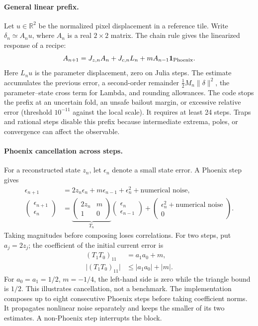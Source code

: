 \documentclass[11pt,a4paper]{article}
\numberwithin{equation}{section}
\newcommand{\abs}[1]{\lvert#1\rvert}
\begin{document}
\paragraph{General linear prefix.}
Let \(u\in\mathbb R^2\) be the normalized pixel displacement in a
reference tile. Write \(\delta_n\simeq A_nu\), where \(A_n\) is a
real \(2\times2\) matrix. The chain rule gives the linearized response
of a recipe:
\begin{equation}
  A_{n+1}=J_{z,n}A_n+J_{c,n}L_n+
           mA_{n-1}\mathbf1_{\rm Phoenix}. \label{eq:prefix-matrix}
\end{equation}
Here \(L_nu\) is the parameter displacement, zero on Julia steps.
The estimate accumulates the previous error, a second-order remainder
\(\tfrac12 M_n\|\delta\|^2\), the parameter--state cross term for
Lambda, and rounding allowances. The code stops the prefix at an
uncertain fold, an unsafe bailout margin, or excessive relative error
(threshold \(10^{-11}\) against the local scale). It requires at least
24 steps. Traps and rational steps disable this prefix because
intermediate extrema, poles, or convergence can affect the observable.

\paragraph{Phoenix cancellation across steps.}
For a reconstructed state \(z_n\), let \(\epsilon_n\) denote a small
state error. A Phoenix step gives
\begin{align}
  \epsilon_{n+1}
    &=2z_n\epsilon_n+m\epsilon_{n-1}
      +\epsilon_n^2+\text{numerical noise},\\
  \begin{pmatrix}\epsilon_{n+1}\\\epsilon_n\end{pmatrix}
    &=
    \underbrace{\begin{pmatrix}2z_n&m\\1&0\end{pmatrix}}_{T_n}
    \begin{pmatrix}\epsilon_n\\\epsilon_{n-1}\end{pmatrix}
    +\begin{pmatrix}\epsilon_n^2+\text{numerical noise}\\0\end{pmatrix}.
\end{align}
Taking magnitudes before composing loses correlations. For two steps,
put \(a_j=2z_j\); the coefficient of the initial current error is
\begin{align*}
  (T_1T_0)_{11}&=a_1a_0+m,\\
  \abs{(T_1T_0)_{11}}&\le\abs{a_1a_0}+\abs m .
\end{align*}
For \(a_0=a_1=1/2\), \(m=-1/4\), the left-hand side is zero while
the triangle bound is \(1/2\). This illustrates cancellation, not a
benchmark. The implementation composes up to eight consecutive
Phoenix steps before taking coefficient norms. It propagates nonlinear
noise separately and keeps the smaller of its two estimates. A
non-Phoenix step interrupts the block.
\end{document}
